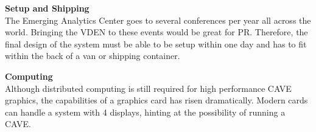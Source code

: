 \filbreak
\noindent\textbf{Setup and Shipping}\\
	The Emerging Analytics Center goes to several conferences per year all across the world. Bringing the VDEN to these events would be great for PR. Therefore, the final design of the system must be able to be setup within one day and has to fit within the back of a van or shipping container.

\filbreak
\noindent\textbf{Computing}\\
	Although distributed computing is still required for high performance CAVE graphics, the capabilities of a graphics card has risen dramatically. Modern cards can handle a system with 4 displays, hinting at the possibility of running a CAVE.

\clearpage
